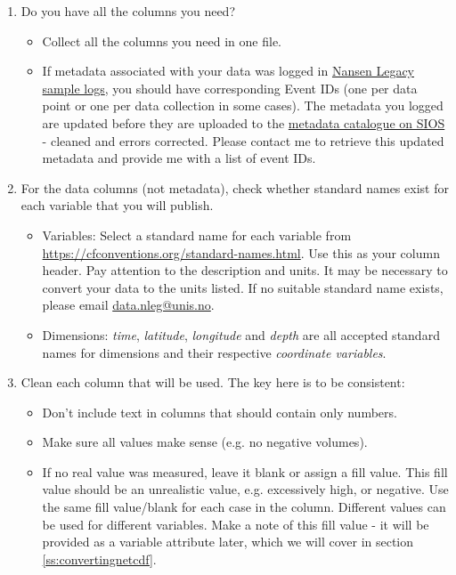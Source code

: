 \documentclass[a4paper,english, 11pt]{article}
\makeatletter
\newcommand{\emailme}{\href{mailto:data.nleg@unis.no}{data.nleg@unis.no}}
\makeatother
\begin{document}
\begin{enumerate}
\item Do you have all the columns you need?
\begin{itemize}
\item Collect all the columns you need in one file.
\item If metadata associated with your data was logged in \href{https://sios-svalbard.org/cgi-bin/darwinsheet/?setup=aen}{Nansen Legacy sample logs}, you should have corresponding Event IDs (one per data point or one per data collection in some cases). The metadata you logged are updated before they are uploaded to the \href{https://sios-svalbard.org/aen/tools}{metadata catalogue on SIOS} - cleaned and errors corrected. 
Please contact me to retrieve this updated metadata and provide me with a list of event IDs.
\end{itemize}
\item For the data columns (not metadata), check whether standard names exist for each variable that you will publish.
\begin{itemize}
\item Variables:
Select a standard name for each variable from \href{https://cfconventions.org/standard-names.html}{https://cfconventions.org/standard-names.html}. Use this as your column header. Pay attention to the description and units. It may be necessary to convert your data to the units listed. If no suitable standard name exists, please email \emailme .
\item Dimensions: \textit{time}, \textit{latitude}, \textit{longitude} and \textit{depth} are all accepted standard names for dimensions and their respective \textit{coordinate variables}.
\end{itemize}
\item Clean each column that will be used. The key here is to be consistent:
\begin{itemize}
\item Don't include text in columns that should contain only numbers.
\item Make sure all values make sense (e.g. no negative volumes).
\item If no real value was measured, leave it blank or assign a fill value. This fill value should be an unrealistic value, e.g. excessively high, or negative. Use the same fill value/blank for each case in the column. Different values can be used for different variables. Make a note of this fill value - it will be provided as a variable attribute later, which we will cover in section \ref{ss:convertingnetcdf}. 
\end{itemize}
\end{enumerate}
\end{document}
